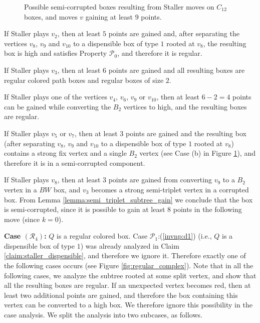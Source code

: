 \documentclass[11pt]{article}
\theoremstyle{definition}
\def\propt1{\mathcal{P}_0}
\def\propbr{\mathcal{P}_1}
\def\regcolored{\mathcal{R}_4}
\begin{document}
\begin{figure}[thbp]
  \caption{\sf Possible semi-corrupted boxes resulting from Staller moves on $C_{12}$ boxes, and moves $v$ gaining at least $9$ points.}
  \medskip
  \centering
  \label{fig:c12_staller_sc}
\end{figure}

If Staller plays $v_2$, then at least $5$ points are gained and, after separating the vertices $v_8$, $v_9$ and $v_{10}$ to a dispensible box of type $1$ rooted at $v_8$,
the resulting box is high and satisfies Property $\propt1$, and therefore it is regular.

If Staller plays $v_3$, then at least $6$ points are gained and all resulting boxes are regular colored path boxes and regular boxes of size $2$.

If Staller plays one of the vertices $v_4$, $v_6$, $v_9$ or $v_{10}$, then at least $6 - 2 = 4$ points can be gained while converting the $B_2$ vertices to high, and the resulting boxes are regular.

If Staller plays $v_5$ or $v_7$, then at least $3$ points are gained and the resulting box (after separating $v_8$, $v_9$ and $v_{10}$ to a dispensible box of type $1$ rooted at $v_8$)
contains a strong fix vertex and a single $B_2$ vertex (see Case (b) in Figure \ref{fig:c12_staller_sc}), and therefore it is in a semi-corrupted component. 

If Staller plays $v_8$, then at least $3$ points are gained from converting $v_9$ to a $B_2$ vertex in a $BW$ box, and $v_3$ becomes a strong semi-triplet vertex in a corrupted box.
From Lemma \ref{lemma:semi_triplet_subtree_gain} we conclude that the box is semi-corrupted, since it is possible to gain at least $8$ points in the following move (since $k = 0$).

\bigskip
\par\noindent
{\bf Case $(\regcolored)$:}
$Q$ is a regular colored box.
Case $\propbr$:(\ref{invnp:d1}) (i.e., $Q$ is a dispensible box of type $1$) was already analyzed in Claim \ref{claim:staller_dispensible}, and therefore we ignore it.
Therefore exactly one of the following cases occurs (see Figure \ref{fig:regular_complex}).
Note that in all the following cases, we analyze the subtree rooted at some split vertex, and show that all the resulting boxes are regular. 
If an unexpected vertex becomes red, then at least two additional points are gained, and therefore the box containing this vertex can be converted to a high box. 
We therefore ignore this possibility in the case analysis.
We split the analysis into two subcases, as follows.
\end{document}
